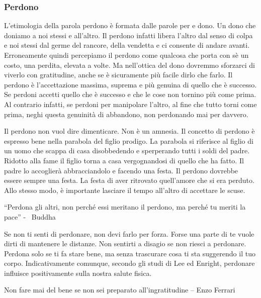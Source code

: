 \documentclass[12pt]{book} %
\begin{document}
\subsubsection{Perdono}
L'etimologia della parola perdono è formata dalle parole per e dono. Un dono che doniamo a noi
stessi e all'altro. Il perdono infatti libera l'altro dal senso di colpa e
noi stessi dal germe del rancore, della vendetta e ci consente di andare avanti. Erroneamente quindi percepiamo il
perdono come qualcosa che porta con sè un costo, una perdita, elevata a volte. Ma nell'ottica del
dono dovremmo sforzarci di viverlo con gratitudine, anche se è sicuramente più facile dirlo che farlo. Il perdono è
l'accettazione massima, suprema e più genuina di quello che è successo. Se perdoni accetti quello
che è successo e che le cose non tornino più come prima. Al contrario infatti, se perdoni per manipolare l'altro, al
fine che tutto torni come prima, neghi questa genuinità di abbandono, non perdonando mai per davvero.

Il perdono non vuol dire dimenticare. Non è un amnesia. Il concetto di perdono è espresso bene nella parabola del figlio
prodigo. La parabola si riferisce al figlio di un uomo che scappa di casa
disobbedendo e sperperando tutti i soldi del padre. Ridotto alla fame il figlio torna a casa vergognandosi di quello
che ha fatto. Il padre lo accoglierà abbracciandolo e facendo una festa. Il perdono dovrebbe essere sempre una festa.
La festa di aver ritrovato quell'amore che si era perduto. Allo stesso modo, è importante lasciare il tempo
all'altro di accettare le scuse.

“Perdona gli altri, non perché essi meritano il perdono, ma perché tu meriti la pace” - \ Buddha

Se non ti senti di perdonare, non devi farlo per forza. Forse una parte di te vuole dirti di mantenere le distanze. Non
sentirti a disagio se non riesci a perdonare. Perdona solo se ti fa stare bene, ma senza trascurare cosa ti sta
suggerendo il tuo corpo. Indicativamente comunque, secondo gli studi di Lee ed Enright, perdonare influisce
positivamente sulla nostra salute fisica.

Non fare mai del bene se non sei preparato all'ingratitudine – Enzo Ferrari
\end{document}
